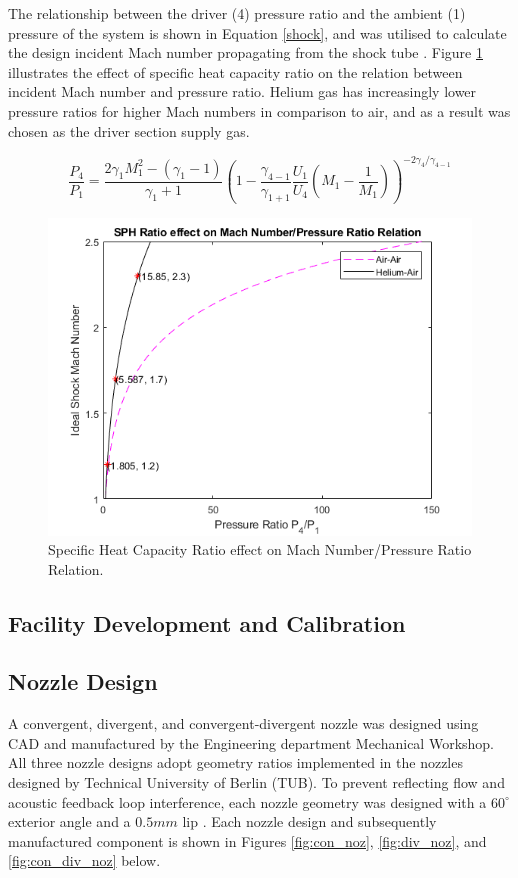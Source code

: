 The relationship between the driver (4) pressure ratio and the ambient (1) pressure of the system is shown in Equation \ref{shock}, and was utilised to calculate the design incident Mach number propagating from the shock tube \cite{anderson2010fundamentals}. Figure \ref{fig:gas_relation} illustrates the effect of specific heat capacity ratio on the relation between incident Mach number and pressure ratio. Helium gas has increasingly lower pressure ratios for higher Mach numbers in comparison to air, and as a result was chosen as the driver section supply gas.

\begin{equation} \label{shock}
\frac{P_4}{P_1} = \frac{2\gamma_1M_1^2 - (\gamma_1 - 1)}{\gamma_1 + 1}\left(1 - \frac{\gamma_{4-1}}{\gamma_{1+1}}\frac{U_1}{U_4}\left(M_1 - \frac{1}{M_1}\right)\right)^{-2\gamma_4/\gamma_{4-1}}
\end{equation}

\begin{figure}[H] 
	\centering
	\includegraphics[scale=0.9]{fig1.png} 
	\caption{Specific Heat Capacity Ratio effect on Mach Number/Pressure Ratio Relation.}
	\label{fig:gas_relation}
\end{figure}
 
\subsection{Facility Development and Calibration}
\subsection{Nozzle Design}
A convergent, divergent, and convergent-divergent nozzle was designed using CAD and manufactured by the Engineering department Mechanical Workshop. All three nozzle designs adopt geometry ratios implemented in the nozzles designed by Technical University of Berlin (TUB). To prevent reflecting flow and acoustic feedback loop interference, each nozzle geometry was designed with a $60^\circ$ exterior angle and a $0.5mm$ lip \cite{poldervaart1968photographic}. Each nozzle design and subsequently manufactured component is shown in Figures \ref{fig:con_noz}, \ref{fig:div_noz}, and \ref{fig:con_div_noz} below. 
 
